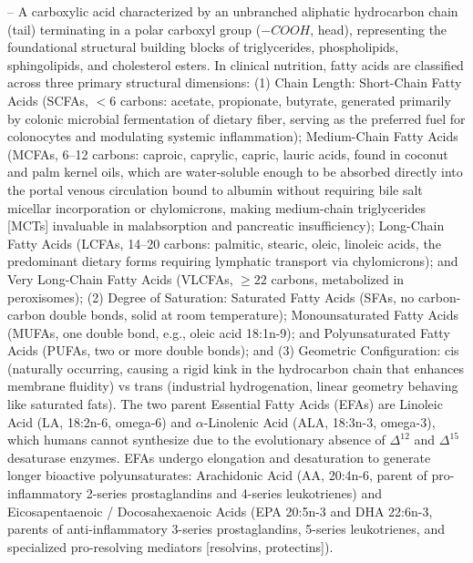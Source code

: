 -- A carboxylic acid characterized by an unbranched aliphatic hydrocarbon chain (tail) terminating in a polar carboxyl group ($-COOH$, head), representing the foundational structural building blocks of triglycerides, phospholipids, sphingolipids, and cholesterol esters. In clinical nutrition, fatty acids are classified across three primary structural dimensions: (1) Chain Length: Short-Chain Fatty Acids (SCFAs, $<6$ carbons: acetate, propionate, butyrate, generated primarily by colonic microbial fermentation of dietary fiber, serving as the preferred fuel for colonocytes and modulating systemic inflammation); Medium-Chain Fatty Acids (MCFAs, 6--12 carbons: caproic, caprylic, capric, lauric acids, found in coconut and palm kernel oils, which are water-soluble enough to be absorbed directly into the portal venous circulation bound to albumin without requiring bile salt micellar incorporation or chylomicrons, making medium-chain triglycerides [MCTs] invaluable in malabsorption and pancreatic insufficiency); Long-Chain Fatty Acids (LCFAs, 14--20 carbons: palmitic, stearic, oleic, linoleic acids, the predominant dietary forms requiring lymphatic transport via chylomicrons); and Very Long-Chain Fatty Acids (VLCFAs, $\ge 22$ carbons, metabolized in peroxisomes); (2) Degree of Saturation: Saturated Fatty Acids (SFAs, no carbon-carbon double bonds, solid at room temperature); Monounsaturated Fatty Acids (MUFAs, one double bond, e.g., oleic acid 18:1n-9); and Polyunsaturated Fatty Acids (PUFAs, two or more double bonds); and (3) Geometric Configuration: cis (naturally occurring, causing a rigid kink in the hydrocarbon chain that enhances membrane fluidity) vs trans (industrial hydrogenation, linear geometry behaving like saturated fats). The two parent Essential Fatty Acids (EFAs) are Linoleic Acid (LA, 18:2n-6, omega-6) and $\alpha$-Linolenic Acid (ALA, 18:3n-3, omega-3), which humans cannot synthesize due to the evolutionary absence of $\Delta^{12}$ and $\Delta^{15}$ desaturase enzymes. EFAs undergo elongation and desaturation to generate longer bioactive polyunsaturates: Arachidonic Acid (AA, 20:4n-6, parent of pro-inflammatory 2-series prostaglandins and 4-series leukotrienes) and Eicosapentaenoic / Docosahexaenoic Acids (EPA 20:5n-3 and DHA 22:6n-3, parents of anti-inflammatory 3-series prostaglandins, 5-series leukotrienes, and specialized pro-resolving mediators [resolvins, protectins]).

